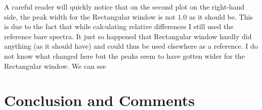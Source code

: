 \documentclass[10pt, titlepage, a4paper]{article}
\begin{document}
A careful reader will quickly notice that on the second plot on the right-hand side, the peak width for the Rectangular window is
not $1.0$ as it should be. This is due to the fact that while calculating relative differences I still used the reference bare spectra.
It just so happened that Rectangular window hardly did anything (as it should have) and could thus be used elsewhere as a reference. I do not know 
what changed here but the peaks seem to have gotten wider for the Rectangular window. We can see 

\section{Conclusion and Comments}

% 
% 

\end{document}
